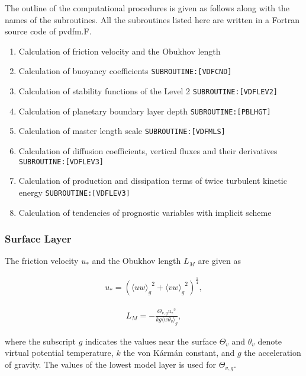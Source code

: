The outline of the computational procedures is given as follows along with the names of the subroutines. All the subroutines listed here are written in a Fortran source code of pvdfm.F.

\begin{enumerate}
\def\labelenumi{\arabic{enumi}.}
\tightlist
\item
  Calculation of friction velocity and the Obukhov length
\item
  Calculation of buoyancy coefficients \texttt{SUBROUTINE:{[}VDFCND{]}}
\item
  Calculation of stability functions of the Level 2 \texttt{SUBROUTINE:{[}VDFLEV2{]}}
\item
  Calculation of planetary boundary layer depth \texttt{SUBROUTINE:{[}PBLHGT{]}}
\item
  Calculation of master length scale \texttt{SUBROUTINE:{[}VDFMLS{]}}
\item
  Calculation of diffusion coefficients, vertical fluxes and their derivatives \texttt{SUBROUTINE:{[}VDFLEV3{]}}
\item
  Calculation of production and dissipation terms of twice turbulent kinetic energy \texttt{SUBROUTINE:{[}VDFLEV3{]}}
\item
  Calculation of tendencies of prognostic variables with implicit scheme
\end{enumerate}

\hypertarget{surface-layer}{%
\subsubsection{Surface Layer}\label{surface-layer}}

The friction velocity \(u_*\) and the Obukhov length \(L_M\) are given as

\begin{eqnarray}u_*=\left({\langle uw \rangle_g}^2+{\langle vw \rangle_g}^2 \right)^\frac{1}{4},\end{eqnarray}

\begin{eqnarray}L_M=-\frac{\Theta_{v,g} {u_*}^3}{kg \langle w\theta_v \rangle_g},\end{eqnarray}

where the subscript \(g\) indicates the values near the surface \(\Theta_v\) and \(\theta_v\) denote virtual potential temperature, \(k\) the von Kármán constant, and \(g\) the acceleration of
gravity. The values of the lowest model layer is used for \(\Theta_{v,g}\).

